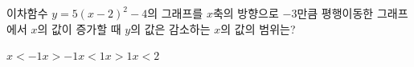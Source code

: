 이차함수 $y=5(x-2)^2-4$의 그래프를 $x$축의 방향으로 $-3$만큼 평행이동한 그래프에서 $x$의 값이 증가할 때 $y$의 값은 감소하는 $x$의 값의 범위는?
\begin{choices32}{$x<-1$}{$x>-1$}{$x<1$}{$x>1$}{$x<2$}\end{choices32}
